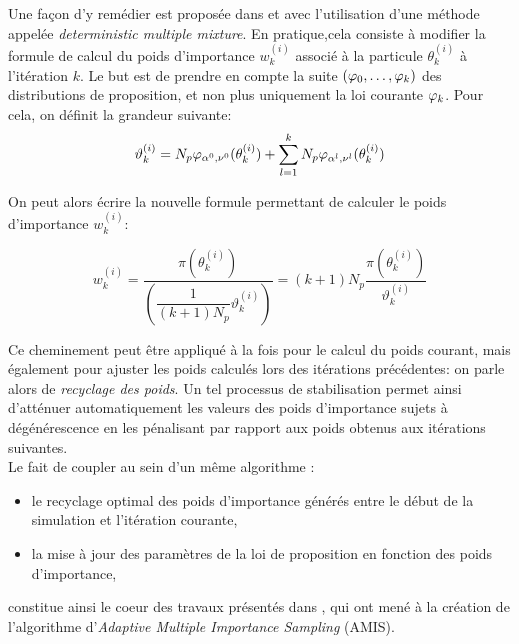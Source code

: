 Une façon d'y remédier est proposée dans \cite{Veach1995} et \cite{Owen2000} avec l'utilisation d'une méthode appelée \textit{deterministic multiple mixture}. En pratique,cela consiste à modifier la formule de calcul du poids d'importance $w_k^{(i)}$ associé à la particule $\theta_k^{(i)}$ à l'itération $k$. Le but est de prendre en compte la suite $({\varphi}_0, \dots, {\varphi}_k)$ des distributions de proposition, et non plus uniquement la loi  courante ${\varphi}_k$. Pour cela, on définit la grandeur suivante:
\begin{equation}
\vartheta_k^{(i)} = N_p {\varphi}_{\alpha^0,\nu^0}(\theta_k^{(i)}) + \sum\limits_{l=1}^k N_p {\varphi}_{\alpha^l,\nu^l}(\theta_k^{(i)})
\label{eq_DMW_1}
\end{equation}

On peut alors écrire la nouvelle formule permettant de calculer le poids d'importance $w_k^{(i)}$:

\begin{equation}
w_k^{(i)} = \dfrac{\pi(\theta_k^{(i)})}{\left(\dfrac{1}{(k+1)N_p}\vartheta_k^{(i)}\right)} = (k+1)N_p\dfrac{\pi(\theta_k^{(i)})}{\vartheta_k^{(i)}}
\end{equation}

Ce cheminement peut être appliqué à la fois pour le calcul du poids courant, mais également pour ajuster les poids calculés lors des itérations précédentes: on parle alors de \textit{recyclage des poids}. Un tel processus de stabilisation  permet ainsi d'atténuer automatiquement les valeurs des poids d'importance sujets à dégénérescence en les pénalisant par rapport aux poids obtenus aux itérations suivantes.\\

Le fait de coupler au sein d'un même algorithme : \\

\begin{itemize}
	\item le  recyclage optimal des poids d'importance générés entre le début de la simulation et l'itération courante,
	\item la mise à jour des paramètres de la loi de proposition en fonction des poids d'importance,\\
\end{itemize}
constitue ainsi le coeur des travaux présentés dans \cite{Cornuet2012}, qui ont mené à la création de l'algorithme d'\textit{Adaptive Multiple Importance Sampling} (AMIS). \\

